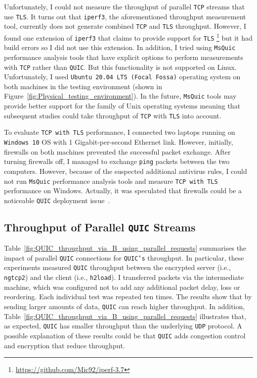 \documentclass[12pt,a4paper]{report}
\begin{document}
Unfortunately, I could not measure the throughput of parallel \texttt{TCP} streams that use \texttt{TLS}.
It turns out that \texttt{iperf3}, the aforementioned throughput measurement tool, currently does not generate combined \texttt{TCP} and \texttt{TLS} throughput.
However, I found one extension of \texttt{iperf3} that claims to provide support for \texttt{TLS} \footnote{\url{https://github.com/Mic92/iperf-3.7}} but it had build errors so I did not use this extension.
In addition, I tried using \texttt{MsQuic} performance analysis tools that have explicit options to perform measurements with \texttt{TCP} rather than \texttt{QUIC}. 
But this functionality is not supported on Linux.
Unfortunately, I used \texttt{Ubuntu 20.04 LTS (Focal Fossa)} operating system on both machines in the testing environment (shown in Figure~\ref{fig:Physical_testing_environment}).
In the future, \texttt{MsQuic} tools may provide better support for the family of Unix operating systems meaning that subsequent studies could take throughput of \texttt{TCP} with \texttt{TLS} into account.

To evaluate \texttt{TCP with TLS} performance, I connected two laptops running on \texttt{Windows 10} OS with 1 Gigabit-per-second Ethernet link.
However, initially, firewalls on both machines prevented the successful packet exchange.
After turning firewalls off, I managed to exchange \texttt{ping} packets between the two computers.
However, because of the suspected additional antivirus rules, I could not run \texttt{MsQuic} performance analysis tools and measure \texttt{TCP with TLS} performance on Windows.
Actually, it was speculated that firewalls could be a noticeable \texttt{QUIC} deployment issue~\cite{The_QUIC_Transport_Protocol_Design_and_Internet-Scale_Deployment}.

\subsection{Throughput of Parallel \texttt{QUIC} Streams}

Table~\ref{fig:QUIC_throughput_via_B_using_parallel_requests} summarises the impact of  parallel \texttt{QUIC} connections for \texttt{QUIC's} throughput.
In particular, these experiments measured \texttt{QUIC} throughput between the encrypted server (i.e., \texttt{ngtcp2}) and the client (i.e., \texttt{h2load}).
I transferred packets via the intermediate machine, which was configured not to add any additional packet delay, loss or reordering.
Each individual test was repeated ten times.
The results show that by sending larger amounts of data, \texttt{QUIC} can reach higher throughput.
In addition, Table~\ref{fig:QUIC_throughput_via_B_using_parallel_requests} illustrates that, as expected, \texttt{QUIC} has smaller throughput than the underlying \texttt{UDP} protocol.
A possible explanation of these results could be that \texttt{QUIC} adds congestion control and encryption that reduce throughput.
\end{document}
